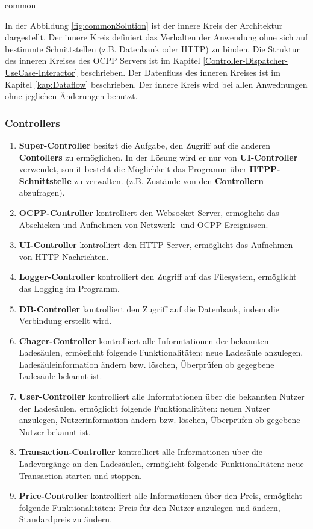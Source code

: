 {common}

In der Abbildung \ref{fig:commonSolution} ist der innere Kreis der Architektur dargestellt. Der innere Kreis definiert das Verhalten der Anwendung 
ohne sich auf bestimmte Schnittstellen (z.B. Datenbank oder HTTP) zu binden. 
Die Struktur des inneren Kreises des OCPP Servers ist im Kapitel \ref{Controller-Dispatcher-UseCase-Interactor} beschrieben. 
Der Datenfluss des inneren Kreises ist im Kapitel \ref{kap:Dataflow} beschrieben.
Der innere Kreis wird bei allen Anwednungen ohne jeglichen Änderungen benutzt.

\newpage
\subsubsection{Controllers}

\begin{enumerate}
    \item \textbf{Super-Controller} besitzt die Aufgabe, den Zugriff auf die anderen \textbf{Contollers} zu ermöglichen. 
    In der Lösung wird er nur von \textbf{UI-Controller} verwendet, somit besteht die Möglichkeit das Programm über \textbf{HTPP-Schnittstelle} zu verwalten. 
    (z.B. Zustände von den \textbf{Controllern} abzufragen).
    \item \textbf{OCPP-Controller} kontrolliert den Websocket-Server, ermöglicht das Abschicken und Aufnehmen von Netzwerk- und OCPP Ereignissen.
    \item \textbf{UI-Controller} kontrolliert den HTTP-Server, ermöglicht das Aufnehmen von HTTP Nachrichten.
    \item \textbf{Logger-Controller} kontrolliert den Zugriff auf das Filesystem, ermöglicht das Logging im Programm.
    \item \textbf{DB-Controller} kontrolliert den Zugriff auf die Datenbank, indem die Verbindung erstellt wird.
    \item \textbf{Chager-Controller} kontrolliert alle Informtationen der bekannten Ladesäulen, 
    ermöglicht folgende Funktionalitäten: neue Ladesäule anzulegen, Ladesäuleinformation ändern bzw. löschen, Überprüfen ob gegegbene Ladesäule bekannt ist.
    \item \textbf{User-Controller} kontrolliert alle Informtationen über die bekannten Nutzer der Ladesäulen, ermöglicht folgende Funktionalitäten:
    neuen Nutzer anzulegen, Nutzerinformation ändern bzw. löschen, Überprüfen ob gegebene Nutzer bekannt ist.
    \item \textbf{Transaction-Controller} kontrolliert alle Informationen über die Ladevorgänge an den Ladesäulen, 
    ermöglicht folgende Funktionalitäten: neue Transaction starten und stoppen.
    \item \textbf{Price-Controller} kontrolliert alle Informationen über den Preis, ermöglicht folgende Funktionalitäten:
    Preis für den Nutzer anzulegen und ändern, Standardpreis zu ändern.
\end{enumerate}

